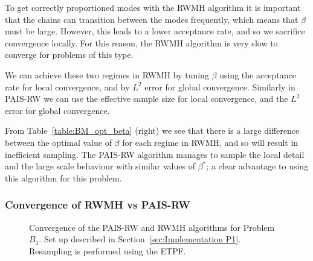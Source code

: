 \documentclass[final]{siamltex}
\begin{document}
To get correctly proportioned modes with the RWMH algorithm it is
important that the chains can transition between the modes frequently, which
means that $\beta$ must be large. However, this leads to a lower
acceptance rate, and so we sacrifice convergence locally. For this reason, the RWMH algorithm is very slow to
converge for problems of this type.

We can achieve these two regimes in RWMH by tuning $\beta$ using the acceptance rate for local convergence, and by $L^2$ error for global convergence. Similarly in PAIS-RW we can use the effective sample size for local convergence, and the $L^2$ error for global convergence.

From Table~\ref{table:BM_opt_beta} (right) we see that there is a large difference between the optimal value of $\beta$ for each regime in RWMH, and so will result in inefficient sampling. The PAIS-RW algorithm manages to sample the local detail and the large scale behaviour with similar values of $\beta^*$; a clear advantage to using this algorithm for this problem.

\subsubsection{Convergence of RWMH vs PAIS-RW}


\begin{figure}[htb]
\centering
{}
\caption{Convergence of the PAIS-RW and RWMH algorithms for Problem $B_1$. Set up described in Section~\ref{sec:Implementation P1}. Resampling is performed using the ETPF.}
\label{fig:BM1_L2}
\end{figure}
\end{document}
